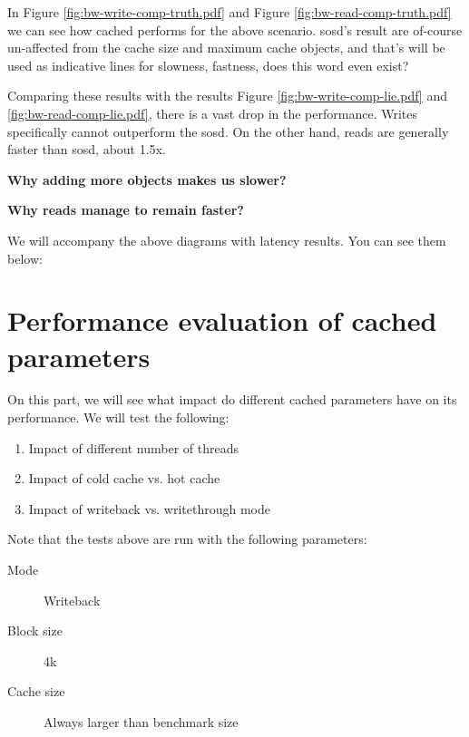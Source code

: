 In Figure \ref{fig:bw-write-comp-truth.pdf} and Figure 
\ref{fig:bw-read-comp-truth.pdf} we can see how cached performs for the above 
scenario. sosd's result are of-course un-affected from the cache size and 
maximum cache objects, and that's will be used as indicative lines for 
slowness, fastness, does this word even exist?

Comparing these results with the results Figure \ref{fig:bw-write-comp-lie.pdf} 
and \ref{fig:bw-read-comp-lie.pdf}, there is a vast drop in the performance. 
Writes specifically cannot outperform the sosd. On the other hand, reads are 
generally faster than sosd, about 1.5x.


\textbf{Why adding more objects makes us slower?}

\textbf{Why reads manage to remain faster?}

We will accompany the above diagrams with latency results. You can see them 
below:



\section{Performance evaluation of cached parameters}

On this part, we will see what impact do different cached parameters have on 
its performance. We will test the following:

\begin{enumerate}
	\item Impact of different number of threads
	\item Impact of cold cache vs. hot cache
	\item Impact of writeback vs. writethrough mode
\end{enumerate}

Note that the tests above are run with the following parameters:

\begin{description}
	\item[Mode] Writeback
	\item[Block size] 4k
	\item[Cache size] Always larger than benchmark size
\end{description}

